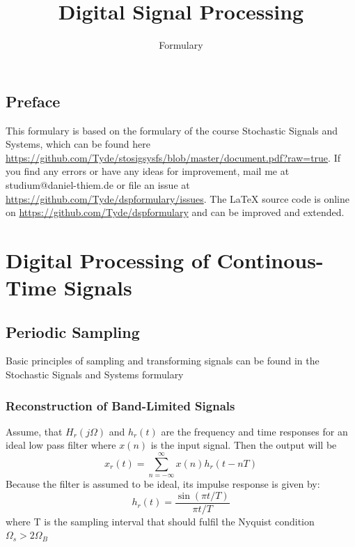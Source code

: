 \documentclass[accentcolor=tud4c,9.5pt,nochapname,bigchapter,paper=a5report]{tudreport}
\begin{document}
\def\Var{{\rm Var}\,}
\def\E{{\rm E}\,}
\def\freq{{\left(e^{j\omega}\right)}\,}


\title{Digital Signal Processing}
\subtitle{Formulary}

\maketitle
\newpage
\thispagestyle{plain}
\mbox{}
\tableofcontents


\section*{Preface}
This formulary is based on the formulary of the course Stochastic Signals and Systems,
 which can be found here \url{https://github.com/Tyde/stosigsysfs/blob/master/document.pdf?raw=true}.
If you find any errors or have any ideas for improvement, mail me at studium@daniel-thiem.de
 or file an issue at \url{https://github.com/Tyde/dspformulary/issues}. The \LaTeX{}  source code is
online on \url{https://github.com/Tyde/dspformulary} and can be improved and extended.

\chapter{Digital Processing of Continous-Time Signals}
\section{Periodic Sampling}
Basic principles of sampling and transforming signals can be found in the Stochastic Signals and Systems formulary
\subsection{Reconstruction of Band-Limited Signals}
Assume, that $H_r(j\Omega)$ and $h_r(t)$ are the frequency and time responses for an ideal low pass filter where 
$x(n)$ is the input signal. Then the output will be
\begin{equation}
	x_r(t) = \sum\limits_{n=-\infty}^{\infty} x(n)h_r(t-nT)
\end{equation}
Because the filter is assumed to be ideal, its impulse response is given by:
\begin{equation}
	h_r(t)=\frac{\sin(\pi t/T)}{\pi t/T}
\end{equation}
where T is the sampling interval that should fulfil the Nyquist condition $\Omega_s > 2 \Omega_B$
\end{document}
